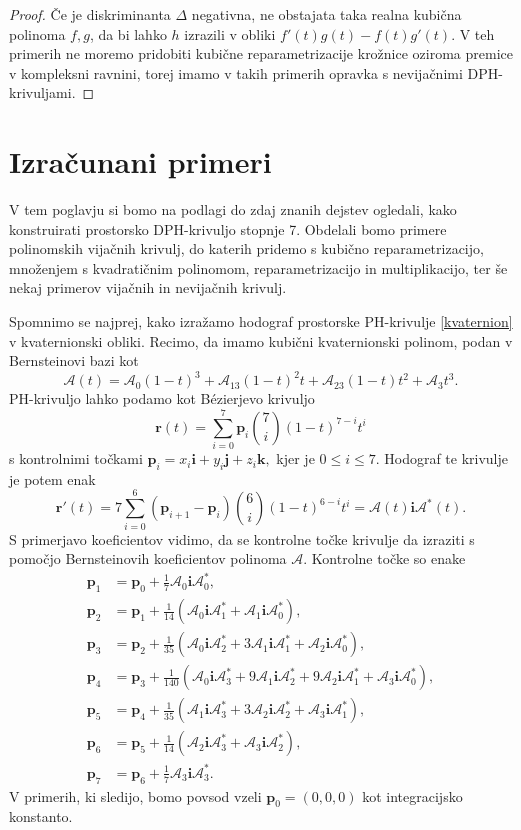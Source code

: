 \documentclass[12pt,a4paper,twoside]{article}
\theoremstyle{definition} %
\theoremstyle{plain} %
\theoremstyle{primerstyle}
\numberwithin{equation}{section}  %
\newcommand{\pV}{\mathbf{p}}
\newcommand{\rV}{\mathbf{r}}
\newcommand{\iV}{\mathbf{i}}
\newcommand{\jV}{\mathbf{j}}
\newcommand{\kV}{\mathbf{k}}
\newcommand{\AQ}{\mathcal{A}}
\begin{document}
\begin{proof}
	Če je diskriminanta $\Delta$ negativna, ne obstajata taka realna kubična polinoma $f,g$, da bi lahko $h$ izrazili v obliki $f'(t)g(t)-f(t)g'(t).$ V teh primerih ne moremo pridobiti kubične reparametrizacije krožnice oziroma premice v kompleksni ravnini, torej imamo v takih primerih opravka s nevijačnimi DPH-krivuljami.
\end{proof}
\clearpage

\section{Izračunani primeri}

V tem poglavju si bomo na podlagi do zdaj znanih dejstev ogledali, kako konstruirati prostorsko DPH-krivuljo stopnje 7. Obdelali bomo primere polinomskih vijačnih krivulj, do katerih pridemo s kubično reparametrizacijo, množenjem s kvadratičnim polinomom, reparametrizacijo in multiplikacijo, ter še nekaj primerov vijačnih in nevijačnih krivulj.

Spomnimo se najprej, kako izražamo hodograf prostorske PH-krivulje \eqref{kvaternion} v kvaternionski obliki. Recimo, da imamo kubični kvaternionski polinom, podan v Bernsteinovi bazi kot
\begin{equation}
	\AQ(t)=\AQ_0(1-t)^3+\AQ_13(1-t)^2t+\AQ_23(1-t)t^2+\AQ_3t^3.
\end{equation}
PH-krivuljo lahko podamo kot Bézierjevo krivuljo
\begin{equation*}
	\rV(t)=\sum_{i=0}^7\pV_i\binom{7}{i}(1-t)^{7-i}t^i
\end{equation*}
s kontrolnimi točkami $\pV_i=x_i\iV+y_i\jV+z_i\kV,$ kjer je $0\leq i\leq 7.$ Hodograf te krivulje je potem enak
\begin{equation*}
	\rV'(t)=7\sum_{i=0}^6(\pV_{i+1}-\pV_i)\binom{6}{i}(1-t)^{6-i}t^i=\AQ(t)\iV\AQ^*(t).
\end{equation*}
S primerjavo koeficientov vidimo, da se kontrolne točke krivulje da izraziti s pomočjo Bernsteinovih koeficientov polinoma $\AQ.$ Kontrolne točke so enake
\begin{align}
	\pV_1&=\pV_0+\frac{1}{7}\AQ_0\iV\AQ_0^*,\nonumber\\
	\pV_2&=\pV_1+\frac{1}{14}(\AQ_0\iV\AQ_1^*+\AQ_1\iV\AQ_0^*),\nonumber\\
	\pV_3&=\pV_2+\frac{1}{35}(\AQ_0\iV\AQ_2^*+3\AQ_1\iV\AQ_1^*+\AQ_2\iV\AQ_0^*),\nonumber\\
	\pV_4&=\pV_3+\frac{1}{140}(\AQ_0\iV\AQ_3^*+9\AQ_1\iV\AQ_2^*+9\AQ_2\iV\AQ_1^*+\AQ_3\iV\AQ_0^*),\label{kontrolne_tocke}\\
	\pV_5&=\pV_4+\frac{1}{35}(\AQ_1\iV\AQ_3^*+3\AQ_2\iV\AQ_2^*+\AQ_3\iV\AQ_1^*),\nonumber\\
	\pV_6&=\pV_5+\frac{1}{14}(\AQ_2\iV\AQ_3^*+\AQ_3\iV\AQ_2^*),\nonumber\\
	\pV_7&=\pV_6+\frac{1}{7}\AQ_3\iV\AQ_3^*.\nonumber
\end{align}
V primerih, ki sledijo, bomo povsod vzeli $\pV_0=(0,0,0)$ kot integracijsko konstanto.
\end{document}
